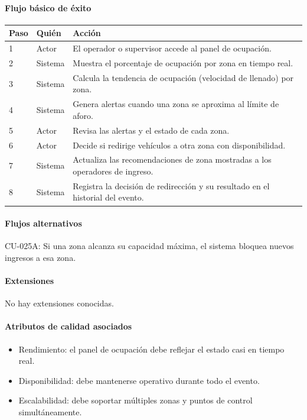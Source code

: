 \paragraph{Flujo básico de éxito}
\begin{longtable}{P{1.1cm}P{1.8cm}P{10.5cm}}
\toprule
\textbf{Paso} & \textbf{Quién} & \textbf{Acción}\\
\midrule
{} & Actor & El operador o supervisor accede al panel de ocupación.\\
2 & Sistema & Muestra el porcentaje de ocupación por zona en tiempo real.\\
3 & Sistema & Calcula la tendencia de ocupación (velocidad de llenado) por zona.\\
4 & Sistema & Genera alertas cuando una zona se aproxima al límite de aforo.\\
5 & Actor & Revisa las alertas y el estado de cada zona.\\
6 & Actor & Decide si redirige vehículos a otra zona con disponibilidad.\\
7 & Sistema & Actualiza las recomendaciones de zona mostradas a los operadores de ingreso.\\
8 & Sistema & Registra la decisión de redirección y su resultado en el historial del evento.\\
\bottomrule
\end{longtable}

\paragraph{Flujos alternativos}
CU-025A: Si una zona alcanza su capacidad máxima, el sistema bloquea nuevos ingresos a esa zona.

\paragraph{Extensiones}
No hay extensiones conocidas.

\paragraph{Atributos de calidad asociados}
\begin{itemize}[leftmargin=1.4em, topsep=1pt]
  \item Rendimiento: el panel de ocupación debe reflejar el estado casi en tiempo real.
  \item Disponibilidad: debe mantenerse operativo durante todo el evento.
  \item Escalabilidad: debe soportar múltiples zonas y puntos de control simultáneamente.
\end{itemize}

